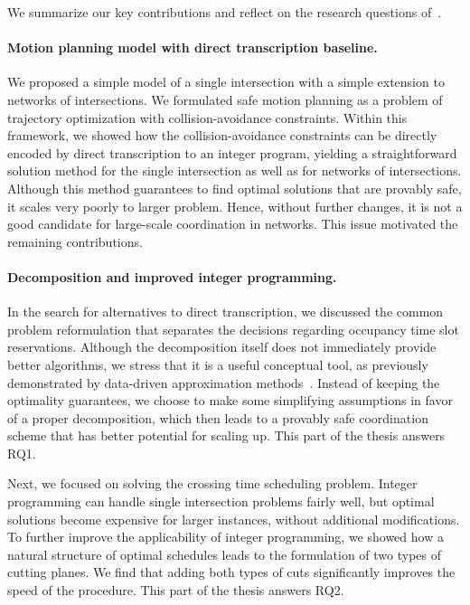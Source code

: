 \documentclass{report}
\theoremstyle{definition}
\theoremstyle{plain}
\begin{document}
We summarize our key contributions and reflect on the research questions
of~.

\paragraph{Motion planning model with direct transcription baseline.}
We proposed a simple model of a single intersection with a simple extension to
networks of intersections.
%
We formulated safe motion planning as a problem of trajectory optimization with
collision-avoidance constraints.
Within this framework, we showed how the collision-avoidance constraints can be
directly encoded by direct transcription to an integer program, yielding a
straightforward solution method for the single intersection as well as for
networks of intersections.
%
Although this method guarantees to find optimal solutions that are provably
safe, it scales very poorly to larger problem.
%
Hence, without further changes, it is not a good candidate for large-scale
coordination in networks.
%
This issue motivated the remaining contributions.

\paragraph{Decomposition and improved integer programming.}

In the search for alternatives to direct transcription, we discussed the common
problem reformulation that separates the decisions regarding occupancy time slot
reservations.
%
Although the decomposition itself does not immediately provide better
algorithms, we stress that it is a useful conceptual tool, as previously
demonstrated by data-driven approximation methods~\cite{hultApproximateSolutionOptimal2015,hultTechnicalReportApproximate}.
Instead of keeping the optimality guarantees, we choose to make some simplifying
assumptions in favor of a proper decomposition, which then leads to a provably
safe coordination scheme that has better potential for scaling up.
%
This part of the thesis answers RQ1.

Next, we focused on solving the crossing time scheduling problem. Integer
programming can handle single intersection problems fairly well, but optimal
solutions become expensive for larger instances, without additional
modifications.
%
To further improve the applicability of integer programming, we showed how a
natural structure of optimal schedules leads to the formulation of two types of
cutting planes.
%
We find that adding both types of cuts significantly improves the speed of the
procedure.
%
This part of the thesis answers RQ2.
\end{document}
